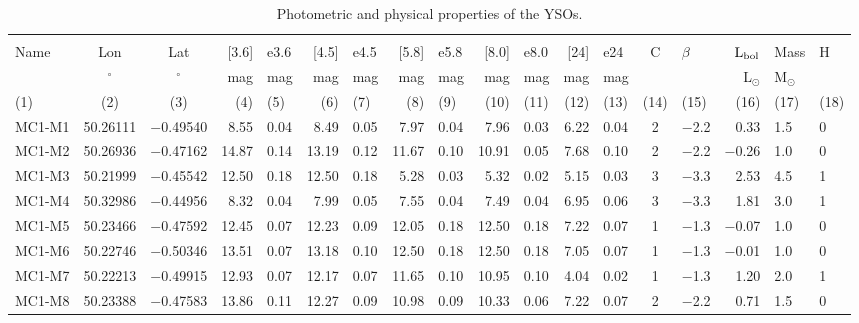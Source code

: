 \documentclass[iop]{emulateapj}
\newcommand{\msun}{M$_{\odot}$}
\newcommand{\lsun}{L$_{\odot}$}
\begin{document}
\begin{table*}[!h!t]
\begin{center}
\centering 
\caption{Photometric and physical properties of the YSOs. }
\begin{tabular}{lccrlrlrlrlrlclrll}
\hline
\hline
  &    &   &   &      &   &  &  &  &  & &  &  &  &  &  & & \\
Name  & Lon & Lat & [3.6] & e3.6 & [4.5] & e4.5 & [5.8] & e5.8 & [8.0] & e8.0 &[24] & e24 & C &\scriptsize $\beta$& $\rm L_{bol}$ &  Mass & H \\
  & $^\circ$   & $^\circ$ & mag & mag  & mag   & mag   & mag  & mag & mag  & mag   & mag   & mag  &        &    & \lsun   & \msun & \\ 
(1) & (2) & (3) & (4)  & (5) & (6)  & (7) & (8) & (9) & (10) & (11) & (12) & (13) & (14) & (15) & (16) & (17) & (18)  \\
\hline
\scriptsize MC1-M1  &  50.26111 & $-$0.49540 &   8.55  &  0.04 &   8.49  &  0.05 &   7.97  &  0.04 &   7.96 &   0.03  &  6.22  &  0.04 &  2 &  $-$2.2  &   0.33  &  1.5 &    0  \\
\scriptsize MC1-M2  &  50.26936 & $-$0.47162 &  14.87  &  0.14 &  13.19  &  0.12 &  11.67  &  0.10 &  10.91 &   0.05  &  7.68  &  0.10 &  2 &  $-$2.2  &$-$0.26  &  1.0 &    0  \\
\scriptsize MC1-M3  &  50.21999 & $-$0.45542 &  12.50  &  0.18 &  12.50  &  0.18 &   5.28  &  0.03 &   5.32 &   0.02  &  5.15  &  0.03 &  3 &  $-$3.3  &   2.53  &  4.5 &    1  \\
\scriptsize MC1-M4  &  50.32986 & $-$0.44956 &   8.32  &  0.04 &   7.99  &  0.05 &   7.55  &  0.04 &   7.49 &   0.04  &  6.95  &  0.06 &  3 &  $-$3.3  &   1.81  &  3.0 &    1  \\
\scriptsize MC1-M5  &  50.23466 & $-$0.47592 &  12.45  &  0.07 &  12.23  &  0.09 &  12.05  &  0.18 &  12.50 &   0.18  &  7.22  &  0.07 &  1 &  $-$1.3  &$-$0.07  &  1.0 &    0  \\
\scriptsize MC1-M6  &  50.22746 & $-$0.50346 &  13.51  &  0.07 &  13.18  &  0.10 &  12.50  &  0.18 &  12.50 &   0.18  &  7.05  &  0.07 &  1 &  $-$1.3  &$-$0.01  &  1.0 &    0  \\
\scriptsize MC1-M7  &  50.22213 & $-$0.49915 &  12.93  &  0.07 &  12.17  &  0.07 &  11.65  &  0.10 &  10.95 &   0.10  &  4.04  &  0.02 &  1 &  $-$1.3  &   1.20  &  2.0 &    1  \\
\scriptsize MC1-M8  &  50.23388 & $-$0.47583 &  13.86  &  0.11 &  12.27  &  0.09 &  10.98  &  0.09 &  10.33 &   0.06  &  7.22  &  0.07 &  2 &  $-$2.2  &   0.71  &  1.5 &    0  \\

\end{tabular}
\end{center}
\end{table*}
\end{document}
